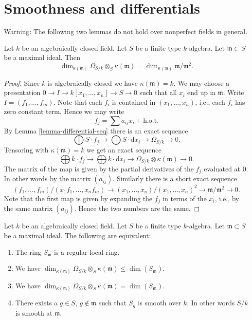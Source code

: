 \section{Smoothness and differentials}
\label{section-smooth-differential}

\noindent
Warning: The following two lemmas do not hold over nonperfect
fields in general.

\begin{lemma}
\label{lemma-rank-omega}
Let $k$ be an algebraically closed field.
Let $S$ be a finite type $k$-algebra.
Let $\mathfrak m \subset S$ be a maximal ideal.
Then
$$
\dim_{\kappa(\mathfrak m)} \Omega_{S/k} \otimes_S \kappa(\mathfrak m)
=
\dim_{\kappa(\mathfrak m)} \mathfrak m/\mathfrak m^2.
$$
\end{lemma}

\begin{proof}
Since $k$ is algebraically closed we have $\kappa(\mathfrak m) = k$.
We may choose a presentation
$0 \to I \to k[x_1, \ldots, x_n] \to S\to 0$ such that
all $x_i$ end up in $\mathfrak m$. Write $I = (f_1, \ldots, f_m)$.
Note that each $f_i$ is contained in $(x_1, \ldots, x_n)$, i.e., each
$f_i$ has zero constant term. Hence we may write
$$
f_j = \sum a_{ij} x_i + \text{h.o.t.}
$$
By Lemma \ref{lemma-differential-seq} there is an exact sequence
$$
\bigoplus S \cdot f_j
\to
\bigoplus S \cdot \text{d}x_i
\to
\Omega_{S/k}
\to
0.
$$
Tensoring with $\kappa(\mathfrak m) = k$ we get
an exact sequence
$$
\bigoplus k \cdot f_j
\to
\bigoplus k \cdot \text{d}x_i
\to
\Omega_{S/k} \otimes \kappa(\mathfrak m)
\to
0.
$$
The matrix of the map is given by the partial derivatives of
the $f_j$ evaluated at $0$. In other words by the matrix $(a_{ij})$.
Similarly there is a short exact sequence
$$
(f_1, \ldots, f_m)/(x_1 f_1, \ldots, x_n f_m)
\to
(x_1, \ldots, x_n)/(x_1, \ldots, x_n)^2
\to
\mathfrak m/\mathfrak m^2
\to
0.
$$
Note that the first map is given by expanding the $f_j$
in terms of the $x_i$, i.e., by the same matrix $(a_{ij})$.
Hence the two numbers are the same.
\end{proof}

\begin{lemma}
\label{lemma-characterize-smooth-kbar}
Let $k$ be an algebraically closed field.
Let $S$ be a finite type $k$-algebra.
Let $\mathfrak m \subset S$ be a maximal ideal.
The following are equivalent:
\begin{enumerate}
\item The ring $S_{\mathfrak m}$ is a regular local ring.
\item We have
$\dim_{\kappa(\mathfrak m)} \Omega_{S/k} \otimes_S \kappa(\mathfrak m)
\leq \dim(S_{\mathfrak m})$.
\item We have
$\dim_{\kappa(\mathfrak m)} \Omega_{S/k} \otimes_S \kappa(\mathfrak m)
= \dim(S_{\mathfrak m})$.
\item There exists a $g \in S$, $g \not \in \mathfrak m$
such that $S_g$ is smooth over $k$. In other words $S/k$
is smooth at $\mathfrak m$.
\end{enumerate}
\end{lemma}


